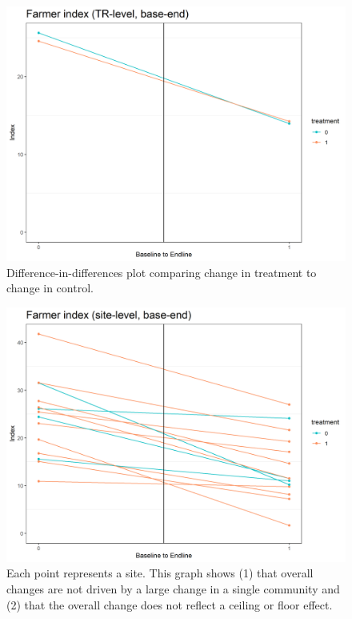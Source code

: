 \documentclass[
]{article}
\begin{document}
\begin{figure}[H]
\centering
\includegraphics[width=\linewidth]{../data_and_code/obs_dat/b_analysis/market_farms_TrTime.plot.png}
\caption{Difference-in-differences plot comparing change in treatment to change in control.}\label{fig:market_farm_TrTime}
\end{figure}

\begin{figure}[H]
\centering
\includegraphics[width=\linewidth]{../data_and_code/obs_dat/b_analysis/market_farms_siteTime.plot.png}
\caption{Each point represents a site. This graph shows (1) that overall changes are not driven by a large change in a single community and (2) that the overall change does not reflect a ceiling or floor effect.}\label{fig:market_farm_siteTime}
\end{figure}
\end{document}
